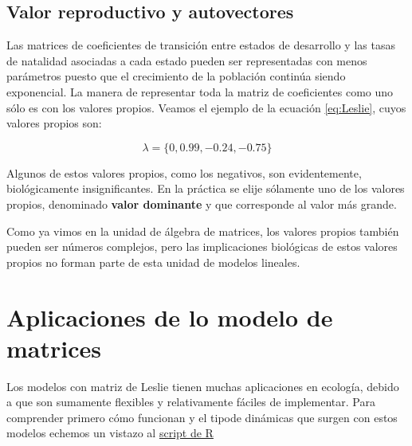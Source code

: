 \documentclass[
]{book}
\begin{document}
\hypertarget{valor-reproductivo-y-autovectores}{%
\subsection{Valor reproductivo y autovectores}\label{valor-reproductivo-y-autovectores}}

Las matrices de coeficientes de transición entre estados de desarrollo y las tasas de natalidad asociadas a cada estado pueden ser representadas con menos parámetros puesto que el crecimiento de la población continúa siendo exponencial. La manera de representar toda la matriz de coeficientes como uno sólo es con los valores propios. Veamos el ejemplo de la ecuación \eqref{eq:Leslie}, cuyos valores propios son:

\[\lambda = \{0, 0.99, -0.24, -0.75 \}\]

Algunos de estos valores propios, como los negativos, son evidentemente, biológicamente insignificantes. En la práctica se elije sólamente uno de los valores propios, denominado \textbf{valor dominante} y que corresponde al valor más grande.

Como ya vimos en la unidad de álgebra de matrices, los valores propios también pueden ser números complejos, pero las implicaciones biológicas de estos valores propios no forman parte de esta unidad de modelos lineales.

\hypertarget{aplicaciones-de-lo-modelo-de-matrices}{%
\section{Aplicaciones de lo modelo de matrices}\label{aplicaciones-de-lo-modelo-de-matrices}}

Los modelos con matriz de Leslie tienen muchas aplicaciones en ecología, debido a que son sumamente flexibles y relativamente fáciles de implementar. Para comprender primero cómo funcionan y el tipode dinámicas que surgen con estos modelos echemos un vistazo al \href{Unidad-VI/Modelos-matriz.R}{script de R}

  
\end{document}
